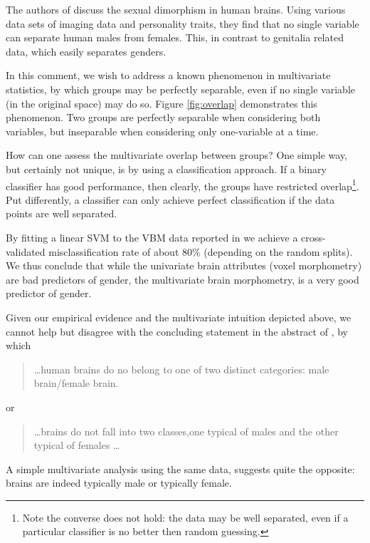 \documentclass{pnastwo}
\begin{document}
\begin{article}


The authors of \cite{joel_sex_2015} discuss the sexual dimorphism in human brains. 
Using various data sets of imaging data and personality traits, they find that no single variable can separate human males from females. This, in contrast to genitalia related data, which easily separates genders. 

In this comment, we wish to address a known phenomenon in multivariate statistics, by which groups may be perfectly separable, even if no single variable (in the original space) may do so. 
Figure \ref{fig:overlap} demonstrates this phenomenon. Two groups are perfectly separable when considering both variables, but inseparable when considering only one-variable at a time.

How can one assess the multivariate overlap between groups?
One simple way, but certainly not unique, is by using a classification approach.
If a binary classifier has good performance, then clearly, the groups have restricted overlap\footnote{Note the converse does not hold: the data may be well separated, even if a particular classifier is no better then random guessing.}.
Put differently, a classifier can only achieve perfect classification if the data points are well separated.

By fitting a linear SVM \cite{hastie_elements_2003} to the VBM data reported in \cite{joel_sex_2015} we achieve a cross-validated misclassification rate of about $80\%$ (depending on the random splits).
We thus conclude that while the univariate brain attributes (voxel morphometry) are bad predictors of gender, the multivariate brain morphometry, is a very good predictor of gender.

Given our empirical evidence and the multivariate intuition depicted above, we cannot help but disagree with the concluding statement in the abstract of \cite{joel_sex_2015}, by which 
\begin{quote}
\dots human brains do no belong to one of two distinct categories: male brain/female brain.
\end{quote}
or 
\begin{quote}
\dots brains do not fall into two classes,one typical of males and the other typical of females \dots
\end{quote}
A simple multivariate analysis using the same data, suggests quite the opposite: brains are indeed typically male or typically female.


\end{article}
\end{document}
